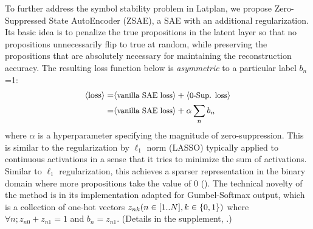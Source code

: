 
To further address the symbol stability problem in Latplan,
we propose Zero-Suppressed State AutoEncoder (ZSAE),
a SAE with an additional regularization.
% 
Its basic idea is to penalize the
true propositions in the latent layer so that no propositions unnecessarily flip to true at random,
while preserving the propositions that are absolutely necessary for maintaining the reconstruction accuracy.
% 
The resulting loss function below is 
\emph{asymmetric} to a particular label $b_n$=1:
\begin{align*}
 \brackets{\text{loss}} = & \brackets{\text{\small vanilla SAE loss}} + \brackets{\text{\small 0-Sup. loss}} \\ 
 =                        & \brackets{\text{\small vanilla SAE loss}} + \alpha \sum_n b_n %
\end{align*}
where $\alpha$ is a hyperparameter specifying the magnitude of zero-suppression.
This is similar to the regularization by $\ell_1$ norm (LASSO) typically applied to continuous activations
in a sense that it tries to minimize the sum of activations.
Similar to $\ell_1$ regularization, this achieves a sparser representation in the binary domain where
more propositions take the value of 0 ().
The technical novelty of the method is in its implementation adapted for Gumbel-Softmax output,
which is a collection of one-hot vectors $z_{nk} (n\in [1..N], k\in {\left\{0,1\right\}})$
where $\forall n; z_{n0} + z_{n1} = 1$ and  $b_n = z_{n1}$.
(Details in the supplement, .)


